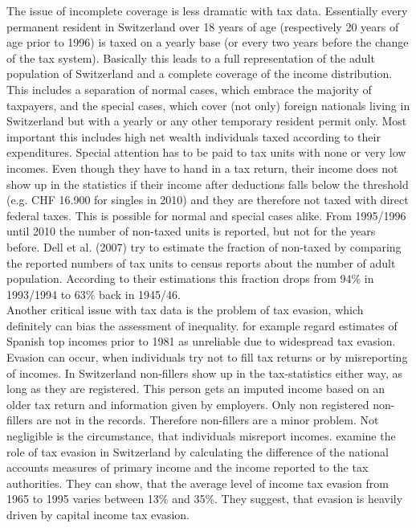 \documentclass[twoside]{article}\usepackage[]{graphicx}\usepackage[]{color}
\begin{document}
\begin{multicols}{2}
The issue of incomplete coverage is less dramatic with tax data. Essentially every permanent resident in Switzerland over 18 years of age (respectively 20 years of age prior to 1996) is taxed on a yearly base (or every two years before the change of the tax system). Basically this leads to a full representation of the adult population of Switzerland and a complete coverage of the income distribution. This includes a separation of normal cases, which embrace the majority of taxpayers, and the special cases, which cover (not only) foreign nationals living in Switzerland but with a yearly or any other temporary resident permit only. Most important this includes high net wealth individuals taxed according to their expenditures. Special attention has to be paid to tax units with none or very low incomes. Even though they have to hand in a tax return, their income does not show up in the statistics if their income after deductions falls below the threshold (e.g. CHF 16.900 for singles in 2010) and they are therefore not taxed with direct federal taxes. This is possible for normal and special cases alike. From 1995/1996 until 2010 the number of non-taxed units is reported, but not for the years before. Dell et al. (2007) try to estimate the fraction of non-taxed by comparing the reported numbers of tax units to census reports about the number of adult population. According to their estimations this fraction drops from 94\% in 1993/1994 to 63\% back in 1945/46. \\

Another critical issue with tax data is the problem of tax evasion, which definitely can bias the assessment of inequality. \citet{alvaredo_income_2009} for example regard estimates of Spanish top incomes prior to 1981 as unreliable due to widespread tax evasion. Evasion can occur, when individuals try not to fill tax returns or by misreporting of incomes. In Switzerland non-fillers show up in the tax-statistics either way, as long as they are registered. This person gets an imputed income based on an older tax return and information given by employers. Only non registered non-fillers are not in the records. Therefore non-fillers are a minor problem. Not negligible is the circumstance, that individuals misreport incomes. \citet{feld_tax_2006} examine the role of tax evasion in Switzerland by calculating the difference of the national accounts measures of primary income and the income reported to the tax authorities. They can show, that the average level of income tax evasion from 1965 to 1995 varies between 13\% and 35\%. They suggest, that evasion is heavily driven by capital income tax evasion. \\



\end{multicols}
\end{document}
